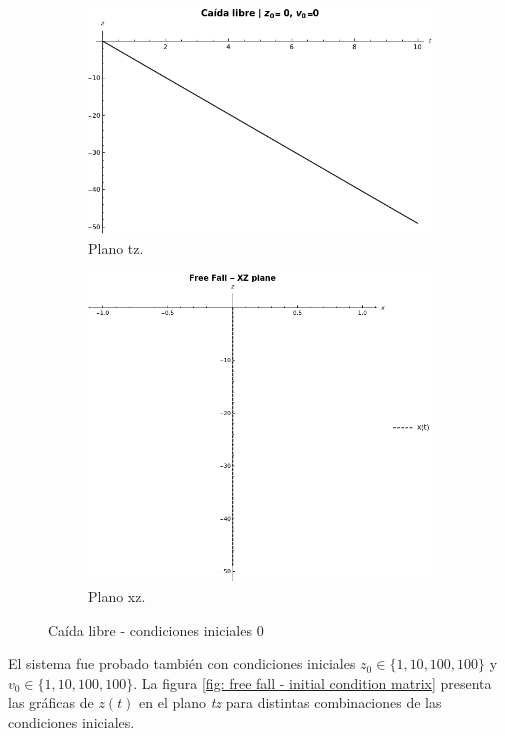 \documentclass[letterpaper,12pt]{article}
\begin{document}
 \begin{figure}[h]
\begin{subfigure}{.5\textwidth}
  \centering
  \includegraphics[width=.8\linewidth]{freefallgraph.png}
  \caption{Plano tz.}
  \label{fig: tz plane}
\end{subfigure}%
\begin{subfigure}{.5\textwidth}
  \centering
  \includegraphics[width=.8\linewidth]{freefallgraphxz.png}
  \caption{Plano xz.}
  \label{fig: xz plane}
\end{subfigure}
\caption{Ca\'ida libre - condiciones iniciales 0}
\label{fig: free fall - 0}
\end{figure}
 
 
 El sistema fue probado tambi\'en con condiciones iniciales $z_0 \in \{1, 10, 100, 100\}$ y $v_0 \in \{1, 10, 100, 100\}$. La figura \ref{fig: free fall - initial condition matrix} presenta las gr\'aficas de $z(t)$ en el plano \emph{tz} para distintas combinaciones de las condiciones iniciales.
 
\end{document}
